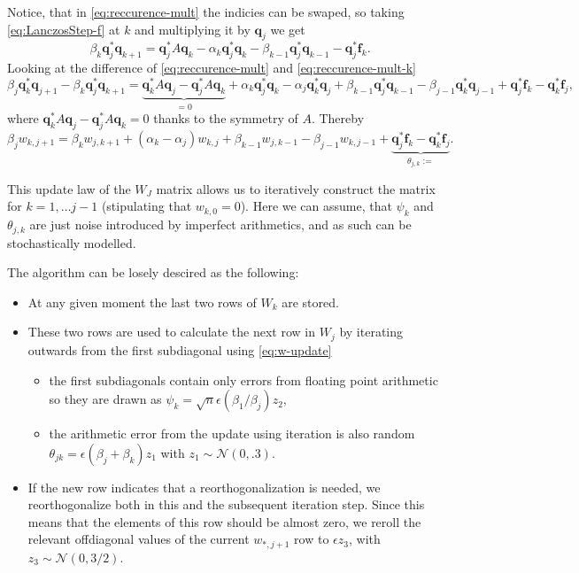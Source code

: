 \documentclass{article}
\begin{document}
	Notice, that in \autoref{eq:reccurence-mult} the indicies can be swaped, so taking \autoref{eq:LanczosStep-f} at $k$ and multiplying it by $\textbf{q}_{j}$ we get
	\begin{equation}\label{eq:reccurence-mult-k}
		\beta_k\mathbf{q}_j^*\mathbf{q}_{k+1}=\mathbf{q}_j^*A\mathbf{q}_k-\alpha_k\mathbf{q}_j^*\mathbf{q}_k-\beta_{k-1}\mathbf{q}_j^*\mathbf{q}_{k-1} - \mathbf{q}_j^*\textbf{f}_k.
	\end{equation}
	Looking at the difference of \autoref{eq:reccurence-mult} and \autoref{eq:reccurence-mult-k}
	\begin{equation}
		\beta_j\mathbf{q}_k^*\mathbf{q}_{j+1} - \beta_k\mathbf{q}_j^*\mathbf{q}_{k+1}=\underbrace{\mathbf{q}_k^*A\mathbf{q}_j - \mathbf{q}_j^*A\mathbf{q}_k}_{=0} +
		\alpha_k\mathbf{q}_j^*\mathbf{q}_k - \alpha_j\mathbf{q}_k^*\mathbf{q}_j + \beta_{k-1}\mathbf{q}_j^*\mathbf{q}_{k-1} - \beta_{j-1}\mathbf{q}_k^*\mathbf{q}_{j-1} + \mathbf{q}_j^*\textbf{f}_k  - \mathbf{q}_k^*\textbf{f}_j,
	\end{equation}
	where $\mathbf{q}_k^*A\mathbf{q}_j - \mathbf{q}_j^*A\mathbf{q}_k = 0$ thanks to the symmetry of $A$. Thereby
	\begin{equation}\label{eq:w-update}
		\beta_j w_{k,j+1} = 
		\beta_k w_{j,k+1} + \left(\alpha_k - \alpha_j\right) w_{k,j} + \beta_{k-1} w_{j, k-1} - \beta_{j-1} w_{k,j-1} + \underbrace{\mathbf{q}_j^*\textbf{f}_k-\mathbf{q}_k^*\textbf{f}_j}_{\theta_{j,k} 
		:=}.
	\end{equation}
	 
	 This update law of the $W_J$ matrix allows us to iteratively construct the matrix for $k=1,\dots j-1$ (stipulating that $w_{k,0} = 0$). Here we can assume, that $\psi_k$ and $\theta_{j,k}$ are just noise introduced by imperfect arithmetics, and as such can be stochastically modelled.
	 
	 The algorithm can be losely descired as the following:
	 \begin{itemize}
	 	\item At any given moment the last two rows of $W_k$ are stored.
	 	\item These two rows are used to calculate the next row in $W_j$ by iterating outwards from the first subdiagonal using \autoref{eq:w-update}
	 	\begin{itemize}
	 		\item the first subdiagonals contain only errors from floating point arithmetic so they are drawn as $\psi_{k}=\sqrt{n}\epsilon(\beta_{1}/\beta_{j}) z_2$,
	 		\item the arithmetic error from the update using iteration is also random $\theta_{jk}=\epsilon(\beta_{j}+\beta_{k})z_1$ with $z_1\sim \mathcal{N}(0,.3)$.
	 	\end{itemize}
	 	\item If the new row indicates that a reorthogonalization is needed, we reorthogonalize both in this and the subsequent iteration step. Since this means that the elements of this row should be almost zero, we reroll the relevant offdiagonal values of the current $w_{*,j+1}$ row to $\epsilon z_3$, with $z_3\sim\mathcal{N}(0,3/2)$.
	 \end{itemize}
	 
\end{document}
